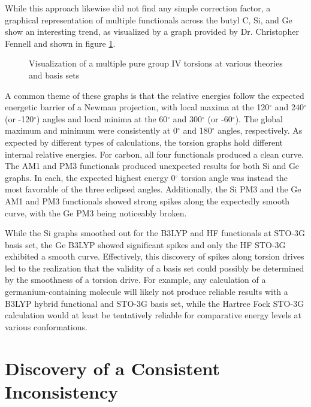 While this approach likewise did not find any simple correction factor, a graphical representation of multiple functionals across the butyl C, Si, and Ge show an interesting trend, as visualized by a graph provided by Dr. Christopher Fennell and shown in figure \ref{fig:FennellTorsion}.
\begin{figure}
	
	\centering
	
	
	\caption{Visualization of a multiple pure group IV torsions at various theories and basis sets}
	
	\label{fig:FennellTorsion}
	
\end{figure}
A common theme of these graphs is that the relative energies follow the expected energetic barrier of a Newman projection, with local maxima at the 120$^{\circ}$ and 240$^{\circ}$ (or -120$^{\circ}$) angles and local minima at the 60$^{\circ}$ and 300$^{\circ}$ (or -60$^{\circ}$).
The global maximum and minimum were consistently at 0$^{\circ}$ and 180$^{\circ}$ angles, respectively.
As expected by different types of calculations, the torsion graphs hold different internal relative energies. 
For carbon, all four functionals produced a clean curve. 
The AM1 and PM3 functionals produced unexpected results for both Si and Ge graphs. 
In each, the expected highest energy 0$^{\circ}$ torsion angle was instead the most favorable of the three eclipsed angles.
Additionally, the Si PM3 and the Ge AM1 and PM3 functionals showed strong spikes along the expectedly smooth curve, with the Ge PM3 being noticeably broken.

While the Si graphs smoothed out for the B3LYP and HF functionals at STO-3G basis set, the Ge B3LYP showed significant spikes and only the HF STO-3G exhibited a smooth curve.
Effectively, this discovery of spikes along torsion drives led to the realization that the validity of a basis set could possibly be determined by the smoothness of a torsion drive.
For example, any calculation of a germanium-containing molecule will likely not produce reliable results with a B3LYP hybrid functional and STO-3G basis set, while the Hartree Fock STO-3G calculation would at least be tentatively reliable for comparative energy levels at various conformations.


\section{Discovery of a Consistent Inconsistency}

